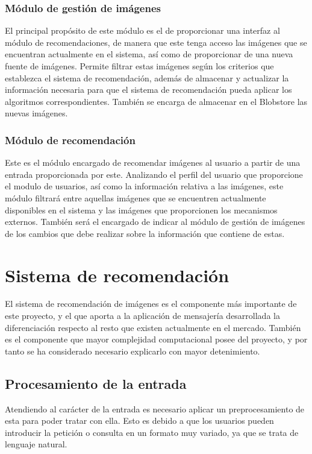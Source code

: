 \subsubsection{Módulo de gestión de imágenes}
El principal propósito de este módulo es el de proporcionar una interfaz al módulo de recomendaciones, de manera que este tenga acceso las imágenes que se encuentran actualmente en el sistema, así como de proporcionar de una nueva fuente de imágenes. Permite filtrar estas imágenes según los criterios que establezca el sistema de recomendación, además de almacenar y actualizar la información necesaria para que el sistema de recomendación pueda aplicar los algoritmos correspondientes. También se encarga de almacenar en el Blobstore las nuevas imágenes.

\subsubsection{Módulo de recomendación}
Este es el módulo encargado de recomendar imágenes al usuario a partir de una entrada proporcionada por este. Analizando el perfil del usuario que proporcione el modulo de usuarios, así como la información relativa a las imágenes, este módulo filtrará entre aquellas imágenes que se encuentren actualmente disponibles en el sistema y las imágenes que proporcionen los mecanismos externos. También será el encargado de indicar al módulo de gestión de imágenes de los cambios que debe realizar sobre la información que contiene de estas. 















\section{Sistema de recomendación}
\label{sec:sistema-recomendacion}
El sistema de recomendación de imágenes es el componente más importante de este proyecto, y el que aporta a la aplicación de mensajería desarrollada la diferenciación respecto al resto que existen actualmente en el mercado. También es el componente que mayor complejidad computacional posee del proyecto, y por tanto se ha considerado necesario explicarlo con mayor detenimiento.


\subsection{Procesamiento de la entrada}
Atendiendo al carácter de la entrada es necesario aplicar un preprocesamiento de esta para poder tratar con ella. Esto es debido a que los usuarios pueden introducir la petición o consulta en un formato muy variado, ya que se trata de lenguaje natural.

